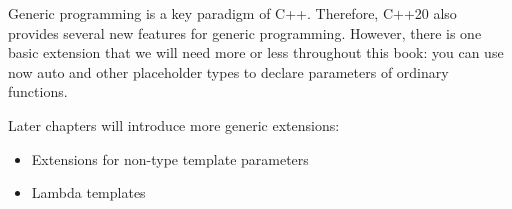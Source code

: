 Generic programming is a key paradigm of C++. Therefore, C++20 also provides several new features for generic programming. However, there is one basic extension that we will need more or less throughout this book: you can use now auto and other placeholder types to declare parameters of ordinary functions.

Later chapters will introduce more generic extensions:

\begin{itemize}
\item
Extensions for non-type template parameters

\item
Lambda templates
\end{itemize}